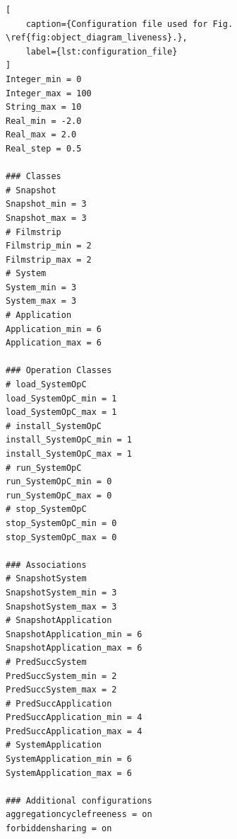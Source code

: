 \begin{lstlisting}[
    caption={Configuration file used for Fig. \ref{fig:object_diagram_liveness}.},
    label={lst:configuration_file}
]
Integer_min = 0
Integer_max = 100
String_max = 10
Real_min = -2.0
Real_max = 2.0
Real_step = 0.5

### Classes
# Snapshot
Snapshot_min = 3
Snapshot_max = 3
# Filmstrip
Filmstrip_min = 2
Filmstrip_max = 2
# System
System_min = 3
System_max = 3
# Application
Application_min = 6
Application_max = 6

### Operation Classes
# load_SystemOpC
load_SystemOpC_min = 1
load_SystemOpC_max = 1
# install_SystemOpC
install_SystemOpC_min = 1
install_SystemOpC_max = 1
# run_SystemOpC
run_SystemOpC_min = 0
run_SystemOpC_max = 0
# stop_SystemOpC
stop_SystemOpC_min = 0
stop_SystemOpC_max = 0

### Associations
# SnapshotSystem
SnapshotSystem_min = 3
SnapshotSystem_max = 3
# SnapshotApplication
SnapshotApplication_min = 6
SnapshotApplication_max = 6
# PredSuccSystem
PredSuccSystem_min = 2
PredSuccSystem_max = 2
# PredSuccApplication
PredSuccApplication_min = 4
PredSuccApplication_max = 4
# SystemApplication
SystemApplication_min = 6
SystemApplication_max = 6

### Additional configurations
aggregationcyclefreeness = on
forbiddensharing = on
\end{lstlisting}